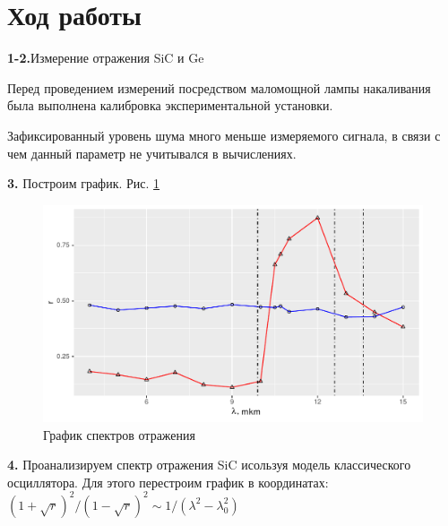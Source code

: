 \documentclass[a4paper,11pt]{report}\usepackage[]{graphicx}\usepackage[]{color}
\makeatletter
\def\maxwidth{ %
  \ifdim\Gin@nat@width>\linewidth
    \linewidth
  \else
    \Gin@nat@width
  \fi
}
\newenvironment{kframe}{%
 \def\at@end@of@kframe{}%
 \ifinner\ifhmode%
  \def\at@end@of@kframe{\end{minipage}}%
  \begin{minipage}{\columnwidth}%
 \fi\fi%
 \def\FrameCommand##1{\hskip\@totalleftmargin \hskip-\fboxsep
 \colorbox{shadecolor}{##1}\hskip-\fboxsep
     \hskip-\linewidth \hskip-\@totalleftmargin \hskip\columnwidth}%
 \MakeFramed {\advance\hsize-\width
   \@totalleftmargin\z@ \linewidth\hsize
   \@setminipage}}%
 {\par\unskip\endMakeFramed%
 \at@end@of@kframe}
\newenvironment{knitrout}{}{} %
\makeatother
\begin{document}
\section*{Ход работы}

\textbf{1-2.}Измерение отражения SiC и Ge

Перед проведением измерений посредством маломощной лампы накаливания была выполнена калибровка экспериментальной установки. 

Зафиксированный уровень шума много меньше измеряемого сигнала, в связи с чем данный параметр не учитывался в вычислениях.

\textbf{3.} Построим график. Рис. \ref{fig:rgraph51}

\begin{knitrout}
\color{fgcolor}\begin{kframe}


{\ttfamily\noindent\bfseries{}}\end{kframe}\begin{figure}[!h]
\includegraphics[width=\maxwidth]{figure/rgraph51-1} \caption[График спектров отражения]{График спектров отражения}\label{fig:rgraph51}
\end{figure}


\end{knitrout}

\textbf{4.} Проанализируем спектр отражения SiC исользуя модель классического осциллятора. Для этого перестроим график в координатах: $(1+\sqrt{r})^2/(1-\sqrt{r})^2 \sim 1/(\lambda^2-\lambda_0^2) $
\end{document}
